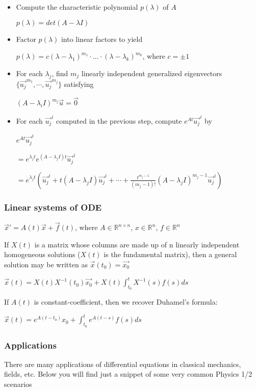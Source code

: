 \documentclass[12pt]{article}
\begin{document}
\begin{itemize}
\item Compute the characteristic polynomial \(p(\lambda)\) of \(A\)
\label{sec:org55c89b3}

\(p(\lambda)=det(A-\lambda I)\)

\item Factor \(p(\lambda)\) into linear factors to yield
\label{sec:orgb2f5c51}

\(p(\lambda) = c(\lambda-\lambda_1)^{m_1} \cdot \ldots \cdot (\lambda-\lambda_k)^{m_k}\), where \(c=\pm 1\)

\item For each \(\lambda_j\), find \(m_j\) linearly independent generalized eigenvectors \(\{\vec{u_j}^{m_1},\cdots,\vec{u_j}^{m_j}\}\) satisfying
\label{sec:orgddea68b}

\((A-\lambda_i I)^{m_j} \vec{u} = \vec{0}\)

\item For each \(\vec{u_j}^i\) computed in the previous step, compute \(e^{At}\vec{u_j}^i\) by
\label{sec:org1d5f26b}

\(e^{At}\vec{u_j}^i\)

\(=e^{\lambda_jt}e^{(A-\lambda_jI)t}\vec{u_j}^i\)

\(=e^{\lambda_jt}(\vec{u_j}^i+t(A-\lambda_jI)\vec{u_j}^i+\cdots+\frac{t^{m_j-1}}{(m_j-1)!}(A-\lambda_jI)^{m_j-1}\vec{u_j}^i)\)
\end{itemize}

\subsubsection*{Linear systems of ODE}
\label{sec:orga210226}
\(\vec{x}' = A(t)\vec{x} + \vec{f}(t)\), where \(A\in\mathbb{R}^{n\times n}\),
\(x\in\mathbb{R}^n\), \(f\in\mathbb{R}^n\)

If \(X(t)\) is a matrix whose columns are made up of n linearly independent
homogeneous solutions (\(X(t)\) is the fundamental matrix), then a general
solution may be written as \(\vec{x}(t_0)=\vec{x_0}\)

\(\vec{x}(t) = X(t)X^{-1}(t_0)\vec{x_0}+X(t)\int_{t_0}^{t}X^{-1}(s)f(s)ds\)

If \(A(t)\) is constant-coefficient, then we recover Duhamel's formula:

\(\vec{x}(t) = e^{A(t-t_0)}x_0 + \int_{t_0}^{t}e^{A(t-s)}f(s)ds\)

\subsubsection*{Applications}
\label{sec:org5600b8b}
There are many applications of differential equations in classical
mechanics, fields, etc. Below you will find just a snippet of some very
common Physics 1/2 scenarios
\end{document}
